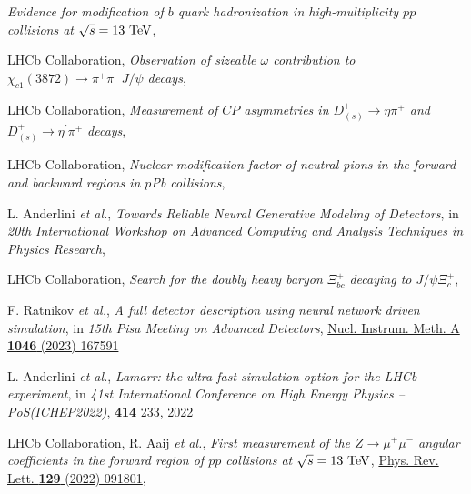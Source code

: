 \begin{cvcontent}
\begin{enumerate}[label={[\arabic*]}, leftmargin=1.5cm]
    \emph{Evidence for modification of $b$ quark hadronization in high-multiplicity $pp$ collisions at $\sqrt{s} = 13~\rm{TeV}$},
    \item LHCb Collaboration,
    \emph{Observation of sizeable $\omega$ contribution to $\chi_{c1}(3872) \to \pi^+ \pi^- J/\psi$ decays},
    \item LHCb Collaboration,
    \emph{Measurement of $CP$ asymmetries in $D^+_{(s)}\rightarrow \eta \pi^+$ and $D^+_{(s)}\rightarrow \eta^{\prime} \pi^+$ decays},
    \item LHCb Collaboration,
    \emph{Nuclear modification factor of neutral pions in the forward and backward regions in $p$Pb collisions},
    \item L. Anderlini \emph{et al.},
    \emph{Towards Reliable Neural Generative Modeling of Detectors},
    in \emph{20th International Workshop on Advanced Computing and Analysis Techniques in Physics Research},
    \sloppy
    \item LHCb Collaboration,
    \emph{Search for the doubly heavy baryon $\Xi_{bc}^{+}$ decaying to $J/\psi \Xi_{c}^{+}$},
  \end{enumerate}
  \vspace{3mm}
  \begin{enumerate}[label={[\arabic*]}, leftmargin=1.5cm]
    \item F. Ratnikov \emph{et al.},
    \emph{A full detector description using neural network driven simulation},
    in \emph{15th Pisa Meeting on Advanced Detectors},
    \href{https://doi.org/10.1016/j.nima.2022.167591}{Nucl. Instrum. Meth. A \textbf{1046} (2023) 167591}
    \item L. Anderlini \emph{et al.},
    \emph{Lamarr: the ultra-fast simulation option for the LHCb experiment},
    in \emph{41st International Conference on High Energy Physics -- PoS(ICHEP2022)},
    \href{https://doi.org/10.22323/1.414.0233}{\textbf{414} 233, 2022}
    \item LHCb Collaboration, R. Aaij \emph{et al.},
    \emph{First measurement of the $Z\rightarrow \mu^+ \mu^-$ angular coefficients in the forward region of $pp$ collisions at $\sqrt{s}=13~\rm{TeV}$},
    \href{https://link.aps.org/doi/10.1103/PhysRevLett.129.091801}{Phys. Rev. Lett. \textbf{129} (2022) 091801},

\end{enumerate}
\end{cvcontent}
